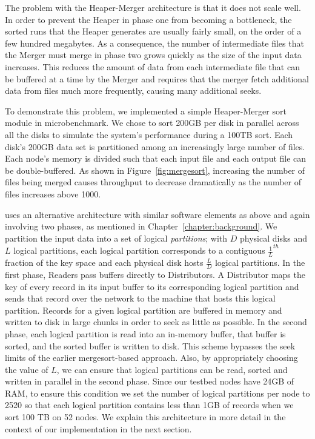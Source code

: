 The problem with the Heaper-Merger architecture is that it does not scale well.
In order to prevent the Heaper in phase one from becoming a bottleneck, the
sorted runs that the Heaper generates are usually fairly small, on the order of
a few hundred megabytes. As a consequence, the number of intermediate files
that the Merger must merge in phase two grows quickly as the size of the input
data increases. This reduces the amount of data from each intermediate file
that can be buffered at a time by the Merger and requires that the merger fetch
additional data from files much more frequently, causing many additional seeks.

To demonstrate this problem, we implemented a simple Heaper-Merger sort module
in microbenchmark. We chose to sort 200GB per disk in parallel across all the
disks to simulate the system's performance during a 100TB sort. Each disk's
200GB data set is partitioned among an increasingly large number of files. Each
node's memory is divided such that each input file and each output file can be
double-buffered. As shown in Figure~\ref{fig:mergesort}, increasing the number
of files being merged causes throughput to decrease dramatically as the number
of files increases above 1000.

\tritonsort uses an alternative architecture with similar software elements as
above and again involving two phases, as mentioned in
Chapter~\ref{chapter:background}.  We partition the input data into a set of
logical \emph{partitions}; with $D$ physical disks and $L$ logical partitions,
each logical partition corresponds to a contiguous $\frac{1}{L}^{th}$ fraction
of the key space and each physical disk hosts $\frac{L}{D}$ logical partitions.
In the first phase, Readers pass buffers directly to Distributors.  A
Distributor maps the key of every record in its input buffer to its
corresponding logical partition and sends that record over the network to the
machine that hosts this logical partition.  Records for a given logical
partition are buffered in memory and written to disk in large chunks in order
to seek as little as possible.  In the second phase, each logical partition is
read into an in-memory buffer, that buffer is sorted, and the sorted buffer is
written to disk.  This scheme bypasses the seek limits of the earlier
mergesort-based approach.  Also, by appropriately choosing the value of $L$, we
can ensure that logical partitions can be read, sorted and written in parallel
in the second phase.  Since our testbed nodes have 24GB of RAM, to ensure this
condition we set the number of logical partitions per node to 2520 so that each
logical partition contains less than 1GB of records when we sort 100 TB on 52
nodes.  We explain this architecture in more detail in the context of our
implementation in the next section.


